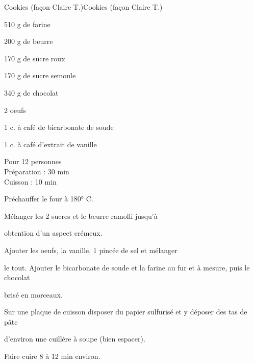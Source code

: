 \begin{recette}{Cookies (façon Claire T.)}{Cookies (façon Claire T.)}

\begin{ingredients}
510 g de farine\par
200 g de beurre\par
170 g de sucre roux\par
170 g de sucre semoule\par
340 g de chocolat\par
2 oeufs\par
1 c. à café de bicarbonate de soude\par
1 c. à café d'extrait de vanille\par
\end{ingredients}

\begin{infos}
Pour 12 personnes\\
Préparation : 30 min\\
Cuisson : 10 min\\
\end{infos}

\begin{etapes}
\item Préchauffer le four à 180° C.
\item Mélanger les 2 sucres et le beurre ramolli jusqu'à
\item obtention d'un aspect crémeux.
\item Ajouter les oeufs, la vanille, 1 pincée de sel et mélanger
\item le tout. Ajouter le bicarbonate de soude et la farine au fur et à mesure, puis le chocolat
\item brisé en morceaux.
\item Sur une plaque de cuisson disposer du papier sulfurisé et y déposer des tas de pâte
\item d'environ une cuillère à soupe (bien espacer).
\item Faire cuire 8 à 12 min environ.
\end{etapes}

\end{recette}